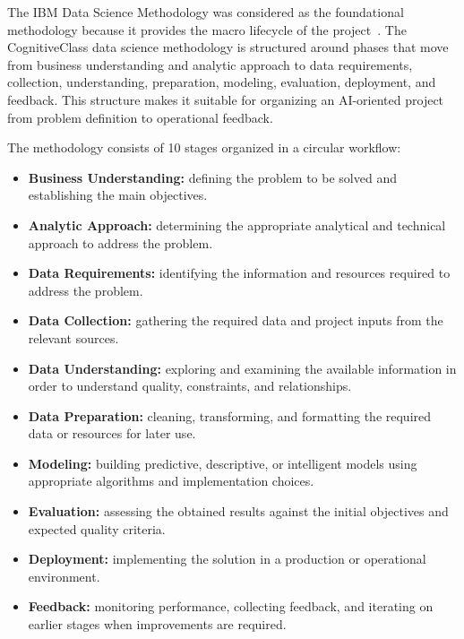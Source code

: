 The IBM Data Science Methodology was considered as the foundational methodology because it provides the macro lifecycle of the project~\cite{ibm_datascience_methodology}. The CognitiveClass data science methodology is structured around phases that move from business understanding and analytic approach to data requirements, collection, understanding, preparation, modeling, evaluation, deployment, and feedback. This structure makes it suitable for organizing an AI-oriented project from problem definition to operational feedback.

The methodology consists of 10 stages organized in a circular workflow:

\begin{itemize}
    \item \textbf{Business Understanding:} defining the problem to be solved and establishing the main objectives.
    
    \item \textbf{Analytic Approach:} determining the appropriate analytical and technical approach to address the problem.
    
    \item \textbf{Data Requirements:} identifying the information and resources required to address the problem.
    
    \item \textbf{Data Collection:} gathering the required data and project inputs from the relevant sources.
    
    \item \textbf{Data Understanding:} exploring and examining the available information in order to understand quality, constraints, and relationships.
    
    \item \textbf{Data Preparation:} cleaning, transforming, and formatting the required data or resources for later use.
    
    \item \textbf{Modeling:} building predictive, descriptive, or intelligent models using appropriate algorithms and implementation choices.
    
    \item \textbf{Evaluation:} assessing the obtained results against the initial objectives and expected quality criteria.
    
    \item \textbf{Deployment:} implementing the solution in a production or operational environment.
    
    \item \textbf{Feedback:} monitoring performance, collecting feedback, and iterating on earlier stages when improvements are required.
\end{itemize}


